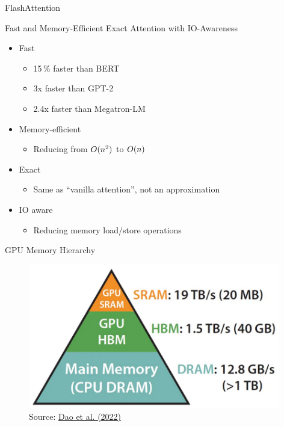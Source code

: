 \begin{vbframe}{F\MakeLowercase{lash}A\MakeLowercase{ttention}}

\vfill

Fast and Memory-Efficient Exact Attention with IO-Awareness \newline

\begin{itemize}
	\item Fast
	\begin{itemize}
		\item 15\,\% faster than BERT
		\item 3x faster than GPT-2 
		\item 2.4x faster than Megatron-LM
	\end{itemize}
	\item Memory-efficient
	\begin{itemize}
		\item Reducing from $O(\MakeLowercase{n}^2)$ to $O(\MakeLowercase{n})$ 
	\end{itemize}
	\item Exact
	\begin{itemize}
		\item Same as ``vanilla attention'', not an approximation 
	\end{itemize}
	\item IO aware
	\begin{itemize}
		\item Reducing memory load/store operations
	\end{itemize}
\end{itemize}

\vfill

\end{vbframe}


\begin{vbframe}{GPU Memory Hierarchy}

\vfill

\begin{figure}
	\centering
	\includegraphics[width = 11cm]{./figure/gpu_mem.png} \\ 
	{\footnotesize Source: \href{https://arxiv.org/abs/2205.14135}{Dao et al. (2022)}}
\end{figure}

\vfill

\end{vbframe}

